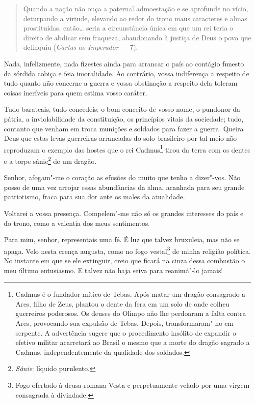 \begin{quote}
Quando a nação não ouça a paternal admoestação e se aprofunde no vício,
deturpando a virtude, elevando ao redor do trono maus caracteres e
almas prostituídas, então\ldots{} seria a circunstância única em que um rei
teria o direito de abdicar sem fraqueza, abandonando à justiça de Deus
o povo que delinquiu (\textit{Cartas ao Imperador} --- 7\ai). 
\end{quote}

Nada, infelizmente, nada fizestes ainda para arrancar o país ao contágio
funesto da sórdida cobiça e feia imoralidade. Ao contrário, vossa
indiferença a respeito de tudo quanto não concerne a guerra e vossa
obstinação a respeito dela toleram coisas incríveis para quem estima vosso caráter.

Tudo barateais, tudo concedeis; o bom conceito de vosso nome, o pundonor
da pátria, a inviolabilidade da constituição, os princípios vitais da
sociedade; tudo, contanto que venham em troca munições e soldados para
fazer a guerra. Queira Deus que estas levas guerreiras arrancadas do
solo brasileiro por tal meio não reproduzam o exemplo das hostes que o
rei Cadmus\footnote{ Cadmus é o fundador mítico de Tebas. Após matar um dragão consagrado a
Ares, filho de Zeus, plantou o dente da fera em um solo de onde colheu
guerreiros poderosos. Os deuses do Olimpo não lhe perdoaram a falta
contra Ares, provocando sua expulsão de Tebas. Depois, 
transformaram"-no em serpente. A advertência sugere que o procedimento
insólito de expandir o efetivo militar acarretará ao Brasil o mesmo que
a morte do dragão sagrado a Cadmus, independentemente da qualidade dos
soldados.} tirou da terra com os dentes e a torpe
sânie\footnote{ \textit{Sânie}: líquido purulento.} de um dragão.

\sectionitem

Senhor, afogam"-me o coração as efusões do muito que tenho a
dizer"-vos. Não posso de uma vez arrojar essas abundâncias da alma,
acanhada para seu grande patriotismo, fraca para sua dor ante os males da atualidade.

Voltarei a vossa presença. Compelem"-me não só os grandes interesses do
país e do trono, como a valentia dos meus sentimentos.

Para mim, senhor, representais uma fé. É luz que talvez bruxuleia, mas
não se apaga. Velo nesta crença augusta, como no fogo
vestal\footnote{ Fogo ofertado à deusa romana Vesta e
perpetuamente velado por uma virgem consagrada à divindade.} 
de minha religião política. No instante em que se ele extinguir, creio
que ficará na cinza dessa combustão o meu último entusiasmo. E talvez
não haja seiva para reanimá"-lo jamais! 

